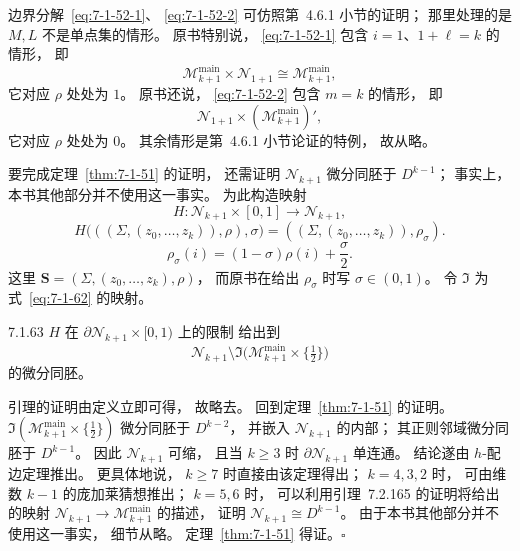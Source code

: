 边界分解~\eqref{eq:7-1-52-1}、
\eqref{eq:7-1-52-2}
可仿照第~4.6.1 小节的证明；
那里处理的是 $M,L$
不是单点集的情形。
原书特别说，
\eqref{eq:7-1-52-1}
包含 $i=1$、$1+\ell=k$ 的情形，
即
\[
\mathcal M^{\mathrm{main}}_{k+1}
\times\mathcal N_{1+1}
\cong
\mathcal M^{\mathrm{main}}_{k+1},
\]
它对应 $\rho$ 处处为 $1$。
原书还说，
\eqref{eq:7-1-52-2}
包含 $m=k$ 的情形，
即
\[
\mathcal N_{1+1}
\times(\mathcal M^{\mathrm{main}}_{k+1})',
\]
它对应 $\rho$ 处处为 $0$。
其余情形是第~4.6.1 小节论证的特例，
故从略。

要完成定理~\ref{thm:7-1-51}
的证明，
还需证明
$\mathcal N_{k+1}$
微分同胚于
$D^{k-1}$；
事实上，本书其他部分并不使用这一事实。
为此构造映射
\[
H\colon
\mathcal N_{k+1}\times[0,1]
\longrightarrow
\mathcal N_{k+1},
\]
\[
H\bigl(
((\Sigma,(z_0,\ldots,z_k)),\rho),
\sigma
\bigr)
=
((\Sigma,(z_0,\ldots,z_k)),\rho_\sigma).
\]
\[
\rho_\sigma(i)
=(1-\sigma)\rho(i)
+\frac{\sigma}{2}.
\]
这里
$\mathbf S=(\Sigma,(z_0,\ldots,z_k),\rho)$，
而原书在给出 $\rho_\sigma$
时写 $\sigma\in(0,1)$。
令 $\mathfrak I$
为式~\eqref{eq:7-1-62} 的映射。

\begin{lemma}{7.1.63}\label{lem:7-1-63}
$H$ 在
$\partial\mathcal N_{k+1}
\times[0,1)$ 上的限制
给出到
\[
\mathcal N_{k+1}\setminus
\mathfrak I\bigl(
\mathcal M^{\mathrm{main}}_{k+1}
\times\{\tfrac12\}
\bigr)
\]
的微分同胚。
\end{lemma}

引理的证明由定义立即可得，
故略去。
回到定理~\ref{thm:7-1-51}
的证明。
$\mathfrak I(
\mathcal M^{\mathrm{main}}_{k+1}
\times\{\tfrac12\})$
微分同胚于
$D^{k-2}$，
并嵌入
$\mathcal N_{k+1}$
的内部；
其正则邻域微分同胚于
$D^{k-1}$。
因此
$\mathcal N_{k+1}$
可缩，
且当 $k\ge3$ 时
$\partial\mathcal N_{k+1}$
单连通。
结论遂由 $h$-配边定理推出。
更具体地说，
$k\ge7$ 时直接由该定理得出；
$k=4,3,2$ 时，
可由维数 $k-1$ 的庞加莱猜想推出；
$k=5,6$ 时，
可以利用引理~7.2.165
的证明将给出的映射
$\mathcal N_{k+1}\to
\mathcal M^{\mathrm{main}}_{k+1}$
的描述，
证明
$\mathcal N_{k+1}\cong D^{k-1}$。
由于本书其他部分并不使用这一事实，
细节从略。
定理~\ref{thm:7-1-51} 得证。\hfill$\square$
